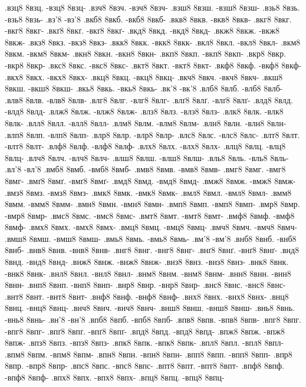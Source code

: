 {.взц8 8взц. -взц8 8взц-
.взч8 8взч. -взч8 8взч-
.взш8 8взш. -взш8 8взш-
.взь8 8взь. -взь8 8взь-
.вз'8 -вз'8
.вкб8 8вкб. -вкб8 8вкб-
.вкв8 8вкв. -вкв8 8вкв-
.вкг8 8вкг. -вкг8 8вкг-
.вкґ8 8вкґ. -вкґ8 8вкґ-
.вкд8 8вкд. -вкд8 8вкд-
.вкж8 8вкж. -вкж8 8вкж-
.вкз8 8вкз. -вкз8 8вкз-
.вкк8 8вкк. -вкк8 8вкк-
.вкл8 8вкл. -вкл8 8вкл-
.вкм8 8вкм. -вкм8 8вкм-
.вкн8 8вкн. -вкн8 8вкн-
.вкп8 8вкп. -вкп8 8вкп-
.вкр8 8вкр. -вкр8 8вкр-
.вкс8 8вкс. -вкс8 8вкс-
.вкт8 8вкт. -вкт8 8вкт-
.вкф8 8вкф. -вкф8 8вкф-
.вкх8 8вкх. -вкх8 8вкх-
.вкц8 8вкц. -вкц8 8вкц-
.вкч8 8вкч. -вкч8 8вкч-
.вкш8 8вкш. -вкш8 8вкш-
.вкь8 8вкь. -вкь8 8вкь-
.вк'8 -вк'8
.влб8 8влб. -влб8 8влб-
.влв8 8влв. -влв8 8влв-
.влг8 8влг. -влг8 8влг-
.влґ8 8влґ. -влґ8 8влґ-
.влд8 8влд. -влд8 8влд-
.влж8 8влж. -влж8 8влж-
.влз8 8влз. -влз8 8влз-
.влк8 8влк. -влк8 8влк-
.влл8 8влл. -влл8 8влл-
.влм8 8влм. -влм8 8влм-
.влн8 8влн. -влн8 8влн-
.влп8 8влп. -влп8 8влп-
.влр8 8влр. -влр8 8влр-
.влс8 8влс. -влс8 8влс-
.влт8 8влт. -влт8 8влт-
.влф8 8влф. -влф8 8влф-
.влх8 8влх. -влх8 8влх-
.влц8 8влц. -влц8 8влц-
.влч8 8влч. -влч8 8влч-
.влш8 8влш. -влш8 8влш-
.вль8 8вль. -вль8 8вль-
.вл'8 -вл'8
.вмб8 8вмб. -вмб8 8вмб-
.вмв8 8вмв. -вмв8 8вмв-
.вмг8 8вмг. -вмг8 8вмг-
.вмґ8 8вмґ. -вмґ8 8вмґ-
.вмд8 8вмд. -вмд8 8вмд-
.вмж8 8вмж. -вмж8 8вмж-
.вмз8 8вмз. -вмз8 8вмз-
.вмк8 8вмк. -вмк8 8вмк-
.вмл8 8вмл. -вмл8 8вмл-
.вмм8 8вмм. -вмм8 8вмм-
.вмн8 8вмн. -вмн8 8вмн-
.вмп8 8вмп. -вмп8 8вмп-
.вмр8 8вмр. -вмр8 8вмр-
.вмс8 8вмс. -вмс8 8вмс-
.вмт8 8вмт. -вмт8 8вмт-
.вмф8 8вмф. -вмф8 8вмф-
.вмх8 8вмх. -вмх8 8вмх-
.вмц8 8вмц. -вмц8 8вмц-
.вмч8 8вмч. -вмч8 8вмч-
.вмш8 8вмш. -вмш8 8вмш-
.вмь8 8вмь. -вмь8 8вмь-
.вм'8 -вм'8
.внб8 8внб. -внб8 8внб-
.внв8 8внв. -внв8 8внв-
.внг8 8внг. -внг8 8внг-
.внґ8 8внґ. -внґ8 8внґ-
.внд8 8внд. -внд8 8внд-
.внж8 8внж. -внж8 8внж-
.внз8 8внз. -внз8 8внз-
.внк8 8внк. -внк8 8внк-
.внл8 8внл. -внл8 8внл-
.внм8 8внм. -внм8 8внм-
.внн8 8внн. -внн8 8внн-
.внп8 8внп. -внп8 8внп-
.внр8 8внр. -внр8 8внр-
.внс8 8внс. -внс8 8внс-
.внт8 8внт. -внт8 8внт-
.внф8 8внф. -внф8 8внф-
.внх8 8внх. -внх8 8внх-
.внц8 8внц. -внц8 8внц-
.внч8 8внч. -внч8 8внч-
.внш8 8внш. -внш8 8внш-
.внь8 8внь. -внь8 8внь-
.вн'8 -вн'8
.впб8 8впб. -впб8 8впб-
.впв8 8впв. -впв8 8впв-
.впг8 8впг. -впг8 8впг-
.впґ8 8впґ. -впґ8 8впґ-
.впд8 8впд. -впд8 8впд-
.впж8 8впж. -впж8 8впж-
.впз8 8впз. -впз8 8впз-
.впк8 8впк. -впк8 8впк-
.впл8 8впл. -впл8 8впл-
.впм8 8впм. -впм8 8впм-
.впн8 8впн. -впн8 8впн-
.впп8 8впп. -впп8 8впп-
.впр8 8впр. -впр8 8впр-
.впс8 8впс. -впс8 8впс-
.впт8 8впт. -впт8 8впт-
.впф8 8впф. -впф8 8впф-
.впх8 8впх. -впх8 8впх-
.впц8 8впц. -впц8 8впц-
}
